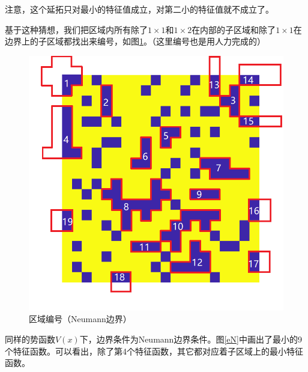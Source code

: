 \documentclass[12pt,a4paper]{article}
\begin{document}
注意，这个延拓只对最小的特征值成立，对第二小的特征值就不成立了。

基于这种猜想，我们把区域内所有除了$1\times1$和$1\times2$在内部的子区域和除了$1\times1$在边界上的子区域都找出来编号，如图\ref{rN}。（这里编号也是用人力完成的）

\begin{figure}[htbp]
\centering
\includegraphics[width=0.4\linewidth]{locate/edVN}
\caption{区域编号（Neumann边界）}
\label{rN}
\end{figure}

同样的势函数$V(x)$下，边界条件为Neumann边界条件。图\ref{eN}中画出了最小的9个特征函数。可以看出，除了第4个特征函数，其它都对应着子区域上的最小特征函数。
\end{document}
